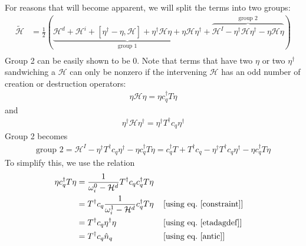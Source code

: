 For reasons that will become apparent, we will split the terms into two groups:
\begin{equation}\begin{aligned}
	\tilde{\mathcal{H}} &= \frac{1}{2}\left(\underbrace{\mathcal{H}^d + \mathcal{H}^i + \left[\eta^\dagger - \eta,\mathcal{H}\right] + \eta^\dagger\mathcal{H}\eta + \eta \mathcal{H} \eta^\dagger}_\text{group 1} + \overbrace{\mathcal{H}^I - \eta^\dagger \mathcal{H}\eta^\dagger - \eta \mathcal{H} \eta}^\text{group 2}\right)\\
\end{aligned}\end{equation}
Group 2 can be easily shown to be 0. Note that terms that have two \(\eta\) or two \(\eta^\dagger\) sandwiching a \(\mathcal{H}\) can only be nonzero if the intervening \(\mathcal{H}\) has an odd number of creation or destruction operators:
\begin{equation}\begin{aligned}
	\label{beats}
\eta \mathcal{H} \eta = \eta c_q^\dagger  T \eta
\end{aligned}\end{equation}
and
\begin{equation}\begin{aligned}
	\label{tora}
\eta^\dagger \mathcal{H}\eta^\dagger = \eta^\dagger T^\dagger c_q \eta^\dagger
\end{aligned}\end{equation}
Group 2 becomes
\begin{equation}\begin{aligned}
	\label{group2}
\text{group 2} = \mathcal{H}^I - \eta^\dagger T^\dagger c_q \eta^\dagger - \eta c_q^\dagger  T \eta = c^\dagger_q T + T^\dagger c_q - \eta^\dagger T^\dagger c_q \eta^\dagger - \eta c_q^\dagger  T \eta
\end{aligned}\end{equation}
To simplify this, we use the relation
\begin{equation}\begin{aligned}
 \eta c_q^\dagger  T \eta &= \frac{1}{\omega_i^0 - \mathcal{H}^d}T^\dagger c_q c_q^\dagger  T \eta\\
			  &= T^\dagger c_q \frac{1}{\omega_i^1 - \mathcal{H}^d}c_q^\dagger  T \eta && \left[\text{using eq.~\ref{constraint}}\right]\\
			  &= T^\dagger c_q \eta^\dagger\eta &&\left[\text{using eq.~\ref{etadagdef}}\right]\\
			  &= T^\dagger c_q \hat n_q &&\left[\text{using eq.~\ref{antic}}\right]
\end{aligned}\end{equation}
